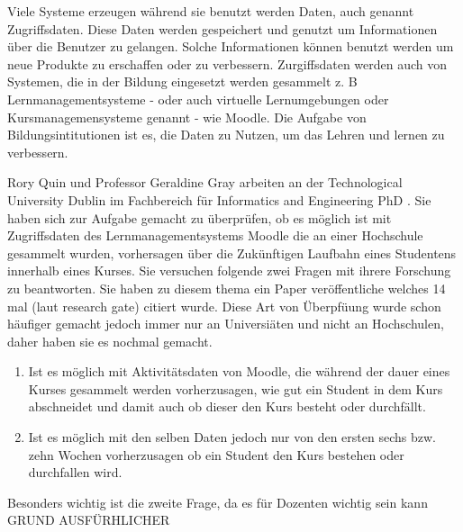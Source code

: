 Viele Systeme erzeugen während sie benutzt werden Daten, auch genannt Zugriffsdaten.
Diese Daten werden gespeichert und genutzt um Informationen über die Benutzer zu gelangen. 
Solche Informationen können benutzt werden um neue Produkte zu erschaffen oder zu verbessern.
Zurgiffsdaten werden auch von Systemen, die in der Bildung eingesetzt werden gesammelt z. B Lernmanagementsysteme - oder auch virtuelle Lernumgebungen oder Kursmanagemensysteme genannt - wie Moodle.
Die Aufgabe von Bildungsintitutionen ist es, die Daten zu Nutzen, um das Lehren und lernen zu verbessern.

Rory Quin und Professor Geraldine Gray arbeiten an der \glqq Technological University Dublin\grqq{} im Fachbereich für \glqq Informatics and Engineering
PhD \grqq{}. Sie haben sich zur Aufgabe gemacht zu überprüfen, ob es möglich ist mit Zugriffsdaten des Lernmanagementsystems Moodle die an einer Hochschule gesammelt wurden,
vorhersagen über die Zukünftigen Laufbahn eines Studentens innerhalb eines Kurses. Sie versuchen folgende zwei Fragen mit ihrere Forschung zu beantworten. Sie haben zu diesem thema ein Paper veröffentliche welches 14 mal (laut research gate) citiert wurde.
Diese Art von Überpfüung wurde schon häufiger gemacht jedoch immer nur an Universiäten und nicht an Hochschulen, daher haben sie es nochmal gemacht.
\begin{enumerate}
    \item Ist es möglich mit Aktivitätsdaten von Moodle, die während der dauer eines Kurses gesammelt werden vorherzusagen, wie gut ein Student in dem Kurs abschneidet und damit auch ob dieser den Kurs besteht oder durchfällt.
    \item Ist es möglich mit den selben Daten jedoch nur von den ersten sechs bzw. zehn Wochen vorherzusagen ob ein Student den Kurs bestehen oder durchfallen wird.
\end{enumerate}
Besonders wichtig ist die zweite Frage, da es für Dozenten wichtig sein kann GRUND AUSFÜRHLICHER


